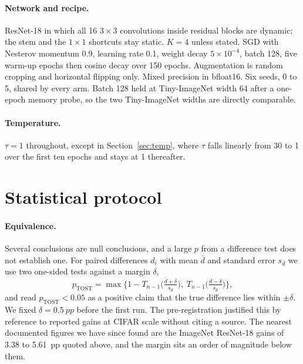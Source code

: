 \documentclass[10pt,a4paper]{article}
\begin{document}
\paragraph{Network and recipe.} ResNet-18 \citep{he2016deep} in which all
16 $3\times3$ convolutions inside residual blocks are dynamic; the stem
and the $1\times1$ shortcuts stay static. $K=4$ unless stated. SGD with
Nesterov momentum 0.9, learning rate 0.1, weight decay $5\times10^{-4}$,
batch 128, five warm-up epochs then cosine decay over 150 epochs.
Augmentation is random cropping and horizontal flipping only. Mixed
precision in bfloat16. Six seeds, 0 to 5, shared by every arm. Batch 128
held at Tiny-ImageNet width 64 after a one-epoch memory probe, so the two
Tiny-ImageNet widths are directly comparable.

\paragraph{Temperature.} $\tau=1$ throughout, except in
Section~\ref{sec:temp}, where $\tau$ falls linearly from 30 to 1 over the
first ten epochs and stays at 1 thereafter.

\section{Statistical protocol}\label{sec:stats}

\paragraph{Equivalence.} Several conclusions are null conclusions, and a
large $p$ from a difference test does not establish one. For paired
differences $d_i$ with mean $\bar d$ and standard error $s_{\bar d}$ we
use two one-sided tests against a margin $\delta$,
\begin{equation}
p_{\text{TOST}}=\max\Big\{1-T_{n-1}\!\Big(\tfrac{\bar d+\delta}{s_{\bar d}}\Big),\;
T_{n-1}\!\Big(\tfrac{\bar d-\delta}{s_{\bar d}}\Big)\Big\},
\end{equation}
and read $p_{\text{TOST}}<0.05$ as a positive claim that the true
difference lies within $\pm\delta$. We fixed $\delta=\SI{0.5}{pp}$ before
the first run. The pre-registration justified this by reference to
reported gains at CIFAR scale without citing a source. The nearest
documented figures we have since found are the ImageNet ResNet-18 gains
of 3.38 to \SI{5.61}{pp} quoted above, and the margin sits an
order of magnitude below them.
\end{document}

